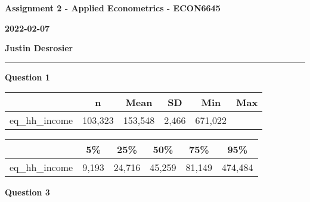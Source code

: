 \documentclass[11pt]{article}
\begin{document}
\sbox{\mybox}{\hbadness=11000 \parbox{2cm}{\lipsum[1]}}


\textbf{Assignment 2 - Applied Econometrics - ECON6645}

\textbf{2022-02-07}

\textbf{Justin Desrosier}

\noindent\rule{16.51cm}{0.4pt}

\textbf{Question 1}

{
\def\sym#1{\ifmmode^{#1}\else\(^{#1}\)\fi}
\begin{tabular}{l*{1}{ccccc}}
\toprule
                    &           n&        Mean&          SD&         Min&         Max          \\
\midrule
eq\_hh\_income & 103,323&  153,548&  2,466&  671,022\\
\bottomrule
\end{tabular}
}
{
\def\sym#1{\ifmmode^{#1}\else\(^{#1}\)\fi}
\begin{tabular}{l*{1}{ccccc}}
\toprule
                    &           5\%&         25\%&         50\%&         75\%&         95\%\\
\midrule
eq\_hh\_income        &              9,193&      24,716&      45,259&      81,149&     474,484\\
\bottomrule
\end{tabular}
}





\textbf{Question 3}
\end{document}
